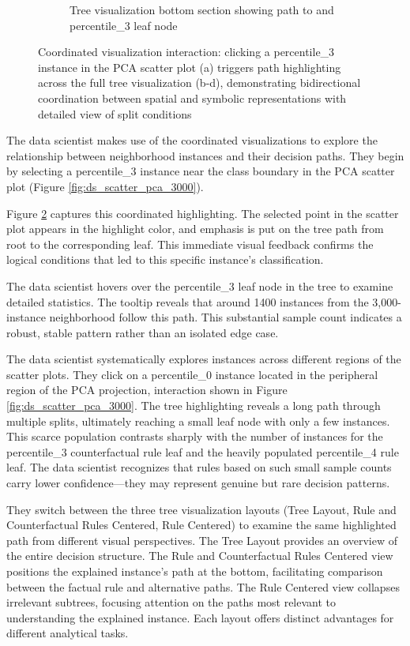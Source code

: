 \begin{figure}[p]
\begin{subfigure}[c]{0.48\textwidth}
        \caption{Tree visualization bottom section showing path to and percentile\_3 leaf node}
        \label{fig:ds_interaction_p3_highlight_tree_bottom}
    \end{subfigure}
    \caption{Coordinated visualization interaction: clicking a percentile\_3 instance in the PCA scatter plot (a) triggers path highlighting across the full tree visualization (b-d), demonstrating bidirectional coordination between spatial and symbolic representations with detailed view of split conditions}
    \label{fig:ds_interaction_p3_highlight}
\end{figure}


The data scientist makes use of the coordinated visualizations to explore the relationship between neighborhood instances and their decision paths. They begin by selecting a percentile\_3 instance near the class boundary in the PCA scatter plot (Figure \ref{fig:ds_scatter_pca_3000}).

Figure \ref{fig:ds_interaction_p3_highlight} captures this coordinated highlighting. The selected point in the scatter plot appears in the highlight color, and emphasis is put on the tree path from root to the corresponding leaf. This immediate visual feedback confirms the logical conditions that led to this specific instance's classification.

The data scientist hovers over the percentile\_3 leaf node in the tree to examine detailed statistics. The tooltip reveals that around 1400 instances from the 3,000-instance neighborhood follow this path. This substantial sample count indicates a robust, stable pattern rather than an isolated edge case.

The data scientist systematically explores instances across different regions of the scatter plots. They click on a percentile\_0 instance located in the peripheral region of the PCA projection, interaction shown in Figure \ref{fig:ds_scatter_pca_3000}. The tree highlighting reveals a long path through multiple splits, ultimately reaching a small leaf node with only a few instances. This scarce population contrasts sharply with the number of instances for the percentile\_3 counterfactual rule leaf and the heavily populated percentile\_4 rule leaf. The data scientist recognizes that rules based on such small sample counts carry lower confidence—they may represent genuine but rare decision patterns.

They switch between the three tree visualization layouts (Tree Layout, Rule and Counterfactual Rules Centered, Rule Centered) to examine the same highlighted path from different visual perspectives. The Tree Layout provides an overview of the entire decision structure. The Rule and Counterfactual Rules Centered view positions the explained instance's path at the bottom, facilitating comparison between the factual rule and alternative paths. The Rule Centered view collapses irrelevant subtrees, focusing attention on the paths most relevant to understanding the explained instance. Each layout offers distinct advantages for different analytical tasks.

